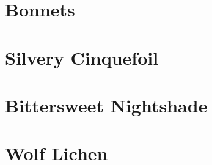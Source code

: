 \documentclass[
]{book}
\begin{document}
\hypertarget{bonnets}{%
\section{Bonnets}\label{bonnets}}

\hypertarget{silvery-cinquefoil}{%
\section{Silvery Cinquefoil}\label{silvery-cinquefoil}}

\hypertarget{bittersweet-nightshade}{%
\section{Bittersweet Nightshade}\label{bittersweet-nightshade}}

\hypertarget{wolf-lichen}{%
\section{Wolf Lichen}\label{wolf-lichen}}

  
\end{document}
